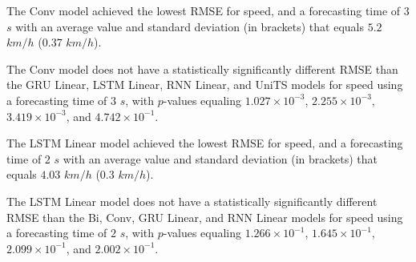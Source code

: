 \begin{table}[!ht]
	\centering
	\caption{The average RMSE in $km/h$, with standard deviation in brackets, across $k$-fold validation datasets for the speed estimated on the $k$-fold testing datasets by different RNN models, and forecasting times.}
	\label{tab:best_speed_RMSE}
\end{table}

The Conv model achieved the lowest RMSE for speed, and a forecasting time of $3$ $s$ with an average value and standard deviation (in brackets) that equals $5.2$ $km/h$ ($0.37$ $km/h$).

The Conv model does not have a statistically significantly different RMSE than the GRU Linear, LSTM Linear, RNN Linear, and UniTS models for speed using a forecasting time of $3$ $s$, with $p$-values equaling $1.027 \times 10^{-3}$, $2.255 \times 10^{-3}$, $3.419 \times 10^{-3}$, and $4.742 \times 10^{-1}$.

The LSTM Linear model achieved the lowest RMSE for speed, and a forecasting time of $2$ $s$ with an average value and standard deviation (in brackets) that equals $4.03$ $km/h$ ($0.3$ $km/h$).

The LSTM Linear model does not have a statistically significantly different RMSE than the Bi, Conv, GRU Linear, and RNN Linear models for speed using a forecasting time of $2$ $s$, with $p$-values equaling $1.266 \times 10^{-1}$, $1.645 \times 10^{-1}$, $2.099 \times 10^{-1}$, and $2.002 \times 10^{-1}$.

